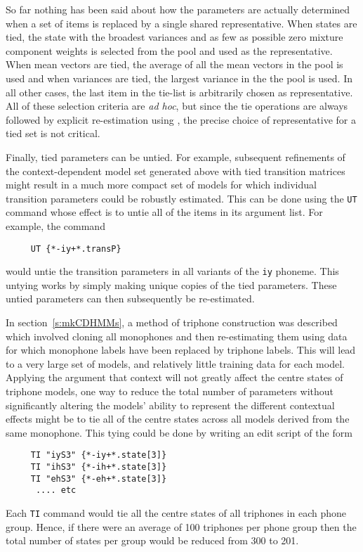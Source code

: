 So far nothing has been said about how the parameters are actually
determined when a set of items is replaced by a single shared representative.
When states are tied, the state with the broadest  variances  and as few as
possible zero mixture component weights is selected from the pool and used
as the representative.  When mean vectors are tied, the average of all the
mean vectors in the pool is used and when variances are tied, the largest
variance in the the pool is used.  In all other cases, the last item in the
tie-list is  arbitrarily chosen as representative.
All of these selection criteria are \textit{ad hoc}, but since
the tie operations are always followed by explicit re-estimation
using , the precise choice of representative for a tied
set is not critical.

Finally, tied parameters can be
untied.  For example,  subsequent refinements of the context-dependent model set
generated above with tied transition matrices might result in
a much more compact set of models for which individual transition
parameters could be robustly estimated.    This 
can be done using the \texttt{UT} command whose effect is to untie all of the
items in its argument list.  For example, the command
\begin{verbatim}
     UT {*-iy+*.transP}
\end{verbatim}
would untie the transition parameters in all variants of the \texttt{iy}
phoneme.
This untying works by simply making unique copies of the tied parameters.
These untied parameters can then subsequently be re-estimated.

 
In
section~\ref{s:mkCDHMMs}, a method of triphone construction was described
which involved cloning all monophones and then re-estimating them using data
for which monophone labels have been replaced by triphone labels.  
This will lead to a very large set of models, and relatively little
training data for each model.  Applying the argument that context will not greatly affect
the centre states of triphone models, one way to reduce the 
total number of parameters without 
significantly altering the models' ability to represent the different
contextual effects might be to tie all of the centre states across all
models derived from the same monophone.  This tying could 
be
done by writing an edit script of the form
\begin{verbatim}
     TI "iyS3" {*-iy+*.state[3]}
     TI "ihS3" {*-ih+*.state[3]}
     TI "ehS3" {*-eh+*.state[3]}
      .... etc
\end{verbatim}
Each \texttt{TI} command would tie all the centre states of all triphones
in each phone group. Hence, if there were an average of 100 triphones
per phone group then the total number of states per group
would be reduced from
300 to 201.

